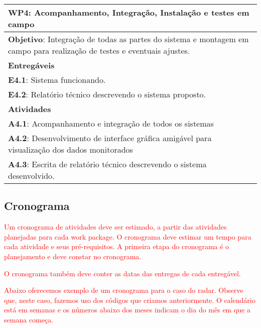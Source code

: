 \begin{longtable}{p{\textwidth}}
\toprule%
\myrowcolour%
\bfseries WP4: Acompanhamento, Integração, Instalação e testes em campo \\
\midrule
\textbf{Objetivo}: Integração de todas as partes do sistema e montagem em campo para realização de testes e eventuais ajustes.\\
\midrule
\myrowcolour%
\bfseries Entregáveis \\
\midrule
\textbf{E4.1}: Sistema funcionando. \\
\textbf{E4.2}: Relatório técnico descrevendo o sistema proposto. \\
\midrule
\myrowcolour%
\bfseries Atividades \\
\midrule
\textbf{A4.1}: Acompanhamento e integração de todos os sistemas \\
\textbf{A4.2}: Desenvolvimento de interface gráfica amigável para visualização dos dados monitorados \\
\textbf{A4.3}: Escrita de relatório técnico descrevendo o sistema desenvolvido.\\
\bottomrule
\end{longtable}

\subsection{Cronograma}
\textcolor{red}{Um cronograma de atividades deve ser estimado, a partir das atividades planejadas para cada work package. O cronograma deve estimar um tempo para cada atividade e seus pré-requisitos. A primeira etapa do cronograma é o planejamento e deve constar no cronograma.}

\textcolor{red}{O cronograma também deve conter as datas das entregas de cada entregável.}

\textcolor{red}{Abaixo oferecemos exemplo de um cronograma para o caso do radar. Observe que, neste caso, fazemos uso dos códigos que criamos anteriormente. O calendário está em semanas e os números abaixo dos meses indicam o dia do mês em que a semana começa.}


